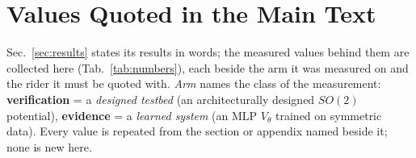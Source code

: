 \documentclass{article}
\begin{document}
\appendix

\section{Values Quoted in the Main Text}\label{app:numbers}

Sec.~\ref{sec:results} states its results in words; the measured values behind them are collected here (Tab.~\ref{tab:numbers}), each beside the arm it was measured on and the rider it must be quoted with. \emph{Arm} names the class of the measurement: \textbf{verification} = a \emph{designed testbed} (an architecturally designed $SO(2)$ potential), \textbf{evidence} = a \emph{learned system} (an MLP $V_\theta$ trained on symmetric data). Every value is repeated from the section or appendix named beside it; none is new here.
\end{document}
